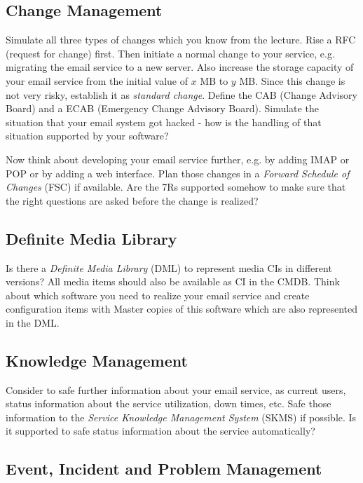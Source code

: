 \subsection{Change Management}
\label{sec:changeManagement}

Simulate all three types of changes which you know from the lecture. Rise a RFC (request for change) first. Then initiate a normal change to your service, e.g. migrating the email service to a new server. Also increase the storage capacity of your email service from the initial value of $x$ MB to $y$ MB. Since this change is not very risky, establish it as \emph{standard change}. Define the CAB (Change Advisory Board) and a ECAB (Emergency Change Advisory Board). Simulate the situation that your email system got hacked - how is the handling of that situation supported by your software?

Now think about developing your email service further, e.g. by adding IMAP or POP or by adding a web interface. Plan those changes in a \emph{Forward Schedule of Changes} (FSC) if available. Are the 7Rs supported somehow to make sure that the right questions are asked before the change is realized?

\subsection{Definite Media Library}
\label{sec:definiteMediaLibrary}

Is there a \emph{Definite Media Library} (DML) to represent media CIs in different versions? All media items should also be available as CI in the CMDB. Think about which software you need to realize your email service and create configuration items with Master copies of this software which are also represented in the DML.

\subsection{Knowledge Management}
\label{sec:knowledgeManagement}

Consider to safe further information about your email service, as current users, status information about the service utilization, down times, etc. Safe those information to the \emph{Service Knowledge Management System} (SKMS) if possible. Is it supported to safe status information about the service automatically?

\subsection{Event, Incident and Problem Management}
\label{sec:eventIncidentProblemManagement}

